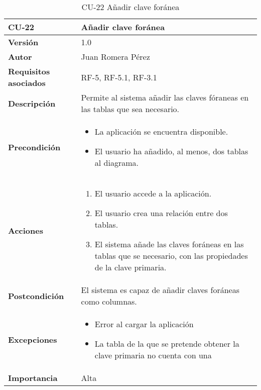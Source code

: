 \begin{table}[p]
    \centering
    \begin{tabularx}{\linewidth}{ p{} p{}}
		\toprule
		\textbf{CU-22}    & \textbf{Añadir clave foránea}\\
		\toprule
		\textbf{Versión}              & 1.0    \\
		\textbf{Autor}                & Juan Romera Pérez \\
		\textbf{Requisitos asociados} & RF-5, RF-5.1, RF-3.1 \\
		\textbf{Descripción}          & Permite al sistema añadir las claves fóraneas en las tablas que sea necesario. \\
		\textbf{Precondición}         & \begin{itemize}
		    \item La aplicación se encuentra disponible.
            \item El usuario ha añadido, al menos, dos tablas al diagrama.
		\end{itemize} \\
		\textbf{Acciones}             &
		\begin{enumerate}
			\def\labelenumi{\arabic{enumi}.}
			\tightlist
			\item El usuario accede a la aplicación.
            \item El usuario crea una relación entre dos tablas.
            \item El sistema añade las claves foráneas en las tablas que se necesario, con las propiedades de la clave primaria.
		\end{enumerate}\\
		\textbf{Postcondición}        & El sistema es capaz de añadir claves foráneas como columnas. \\
		\textbf{Excepciones}          & \begin{itemize}
		    \item Error al cargar la aplicación
            \item La tabla de la que se pretende obtener la clave primaria no cuenta con una
		\end{itemize} \\
		\textbf{Importancia}          & Alta \\
		\bottomrule
    \end{tabularx}
    \caption{CU-22 Añadir clave foránea}
\end{table}

